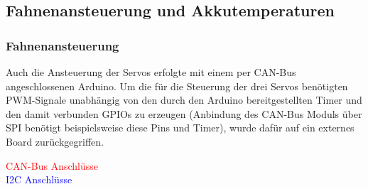 \subsection{Fahnenansteuerung und Akkutemperaturen}
\subsubsection{Fahnenansteuerung}
Auch die Ansteuerung der Servos erfolgte mit einem per CAN-Bus angeschlossenen Arduino. Um die für die Steuerung der drei Servos benötigten PWM-Signale unabhängig von den durch den Arduino bereitgestellten Timer und den damit verbunden GPIOs zu erzeugen 
(Anbindung des CAN-Bus Moduls über SPI benötigt beispielsweise diese Pins und Timer), wurde dafür auf ein externes Board zurückgegriffen.

\begin{minipage}{8.5cm}
\end{minipage}
\begin{minipage}{7cm}
    \textcolor{red}{CAN-Bus Anschlüsse}\\
    \textcolor{blue}{I2C Anschlüsse}\\
    
\end{minipage}\\

